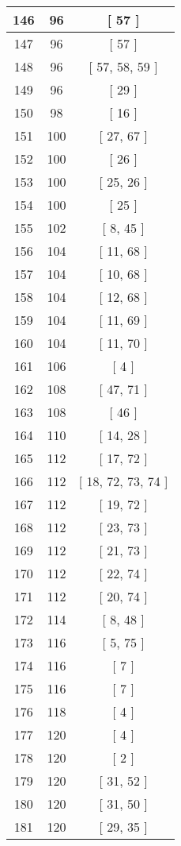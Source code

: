 \begin{center}
\begin{longtable}[H]{|| c c c ||}
\hline
146 & 96 & [ 57 ] \\ 
\hline
147 & 96 & [ 57 ] \\ 
\hline
148 & 96 & [ 57, 58, 59 ] \\ 
\hline
149 & 96 & [ 29 ] \\ 
\hline
150 & 98 & [ 16 ] \\ 
\hline
151 & 100 & [ 27, 67 ] \\ 
\hline
152 & 100 & [ 26 ] \\ 
\hline
153 & 100 & [ 25, 26 ] \\ 
\hline
154 & 100 & [ 25 ] \\ 
\hline
155 & 102 & [ 8, 45 ] \\ 
\hline
156 & 104 & [ 11, 68 ] \\ 
\hline
157 & 104 & [ 10, 68 ] \\ 
\hline
158 & 104 & [ 12, 68 ] \\ 
\hline
159 & 104 & [ 11, 69 ] \\ 
\hline
160 & 104 & [ 11, 70 ] \\ 
\hline
161 & 106 & [ 4 ] \\ 
\hline
162 & 108 & [ 47, 71 ] \\ 
\hline
163 & 108 & [ 46 ] \\ 
\hline
164 & 110 & [ 14, 28 ] \\ 
\hline
165 & 112 & [ 17, 72 ] \\ 
\hline
166 & 112 & [ 18, 72, 73, 74 ] \\ 
\hline
167 & 112 & [ 19, 72 ] \\ 
\hline
168 & 112 & [ 23, 73 ] \\ 
\hline
169 & 112 & [ 21, 73 ] \\ 
\hline
170 & 112 & [ 22, 74 ] \\ 
\hline
171 & 112 & [ 20, 74 ] \\ 
\hline
172 & 114 & [ 8, 48 ] \\ 
\hline
173 & 116 & [ 5, 75 ] \\ 
\hline
174 & 116 & [ 7 ] \\ 
\hline
175 & 116 & [ 7 ] \\ 
\hline
176 & 118 & [ 4 ] \\ 
\hline
177 & 120 & [ 4 ] \\ 
\hline
178 & 120 & [ 2 ] \\ 
\hline
179 & 120 & [ 31, 52 ] \\ 
\hline
180 & 120 & [ 31, 50 ] \\ 
\hline
181 & 120 & [ 29, 35 ] \\ 

\end{longtable}
\end{center}
